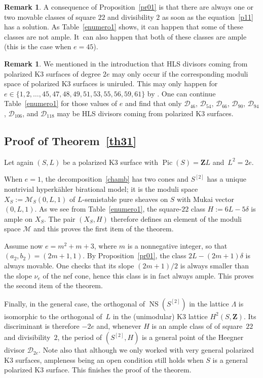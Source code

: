\documentclass[11pt]{article}
\let\mathcal\mathscr
\theoremstyle{definition}
\newtheorem{rema}[lemm]{Remark}
\newcommand\Z{{\mathbf Z}}
\newcommand\cD{\mathcal{D}}
\newcommand\cM{\mathcal{M}}
\let\Ld L
\DeclareMathOperator{\NS}{NS}
\DeclareMathOperator{\Pic}{Pic}
\newcommand\hilbS{S^{[2]}}
\newcommand\hk{hyperkähler\xspace}
\begin{document}
\begin{rema}
A consequence of Proposition~\ref{pr01} is that there are always one or two movable classes of square $22$ and divisibility $2$ as soon as the equation~\eqref{p11} has a solution. As Table~\ref{enumero1} shows, it can happen that some of these classes are not ample.
It~can also happen that both of these classes are ample (this is the case when $e=45$).
\end{rema}

\begin{rema}\label{other}
We mentioned in the introduction that HLS divisors coming from polarized K3 surfaces of degree $2e$ may only occur if the corresponding moduli space of polarized K3 surfaces is uniruled. This may only happen for $e\in\{1,2,\dots,45,47,48,49,51,53,55,56,59,61\} $ by \cite{ghs}. One can continue Table~\ref{enumero1} for those values of $e$ and find that only $\cD_{46}$, $
\cD_{54}$, $\cD_{66}$, $\cD_{90}$, $\cD_{94}$, $\cD_{106}$, and $\cD_{118}$ may be HLS divisors coming from polarized K3 surfaces.
\end{rema}

\subsection{Proof of Theorem~\ref{th31}}

Let again $(S,L)$ be a polarized K3 surface with $\Pic(S)=\Z L$ and~$L^2=2e$.

When $e=1$, the decomposition~\eqref{chamb} has two cones and $ \hilbS$ has a unique nontrivial \hk birational model; it is the
moduli space $X_S:=\cM_S(0,L,1)$ of $L$-semistable pure sheaves on $S$ with Mukai vector $(0,L,1)$. As we see from Table~\ref{enumero1}, the square-$22$ class $H:=6L-5\delta$ is ample on $X_S$. The pair $(X_S,H)$ therefore defines an element of the moduli space $\cM$ and this proves the first item of the theorem.

Assume now $e=m^2+m+3$, where
$m$ is a nonnegative integer, so that $(a_2,b_2)=(2m+1,1)$. By Proposition~\ref{pr01}, the class $2\Ld-(2m+1)\delta$ is always movable. One checks that its slope $(2m+1)/2$ is always smaller than the slope $\nu_e$ of the nef cone, hence this class is in fact always ample. This proves the second item of the theorem.

Finally, in
the general case, the orthogonal of $\NS(\hilbS) $ in the lattice $\Lambda$ is isomorphic to the orthogonal of~$L$ in the (unimodular) K3 lattice $H^2(S,\Z)$. Its discriminant is therefore $-2e$ and, whenever $H$ is an ample class of of square~$22$ and divisibility~$2$, the period of $(\hilbS,H)$ is a general point of the Heegner divisor $\cD_{2e}$. Note also that although we only worked with very general polarized K3 surfaces, ampleness being an open condition still holds when $S$ is a general polarized K3 surface. This finishes the proof of the theorem.
\end{document}
